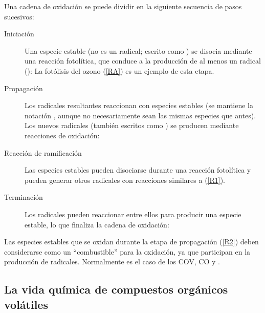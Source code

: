 Una cadena de oxidación se puede dividir en la siguiente secuencia de pasos sucesivos:

\begin{description}
\item[Iniciación ] Una especie estable (no es un radical; escrito como ) se disocia mediante una reacción fotolítica, que conduce a la producción de al menos un radical ():
La fotólisis del ozono (\ref{RA}) es un ejemplo de esta etapa.
\item[Propagación ] Los radicales resultantes reaccionan con especies estables (se mantiene la notación , aunque no necesariamente sean las mismas especies que antes). Los nuevos radicales (también escritos como ) se producen mediante reacciones de oxidación:
\item[Reacción de ramificación]  Las especies estables pueden disociarse durante una reacción fotolítica y pueden generar otros radicales con reacciones similares a (\ref{R1}).
\item[Terminación ] Los radicales pueden reaccionar entre ellos para producir una especie estable, lo que finaliza la cadena de oxidación:

\end{description}

Las especies estables que se oxidan durante la etapa de propagación (\ref{R2}) deben considerarse como un “combustible” para la oxidación, ya que participan en la producción de radicales. Normalmente es el caso de los COV, CO y .

\subsection{La vida química de compuestos orgánicos volátiles}\label{72cov}

